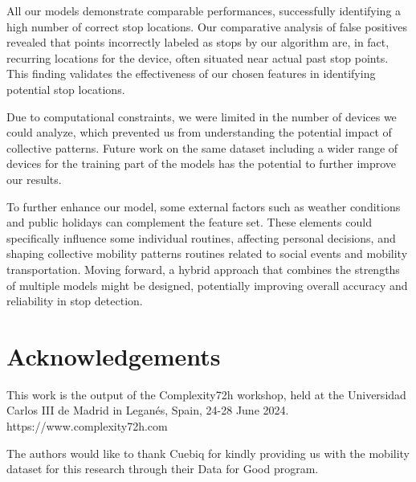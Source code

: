 \documentclass{article}
\begin{document}
All our models demonstrate comparable performances, successfully identifying a high number of correct stop locations. Our comparative analysis of false positives revealed that points incorrectly labeled as stops by our algorithm are, in fact, recurring locations for the device, often situated near actual past stop points. 
This finding validates the effectiveness of our chosen features in identifying potential stop locations.

Due to computational constraints, we were limited in the number of devices we could analyze, which prevented us from understanding the potential impact of collective patterns. Future work on the same dataset including a wider range of devices for the training part of the models has the potential to further improve our results.

To further enhance our model, some external factors such as weather conditions and public holidays can complement the feature set. These elements could specifically influence some individual routines, affecting personal decisions, and shaping collective mobility patterns routines related to social events and mobility transportation. Moving forward, a hybrid approach that combines the strengths of multiple models might be designed, potentially improving overall accuracy and reliability in stop detection.


\section{Acknowledgements}
This work is the output of the Complexity72h workshop, held at the Universidad Carlos III de Madrid in Leganés, Spain, 24-28 June 2024. https://www.complexity72h.com

The authors would like to thank Cuebiq for kindly providing us with the mobility dataset for this research through their Data for Good program.





\end{document}
